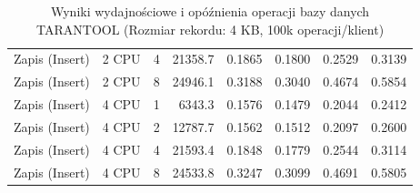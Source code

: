 \begin{table}[ht]
{\begin{tabular}{llcrrrrr}
Zapis (Insert) & 2 CPU & 4 & 21358.7 & 0.1865 & 0.1800 & 0.2529 & 0.3139 \\
Zapis (Insert) & 2 CPU & 8 & 24946.1 & 0.3188 & 0.3040 & 0.4674 & 0.5854 \\
Zapis (Insert) & 4 CPU & 1 & 6343.3 & 0.1576 & 0.1479 & 0.2044 & 0.2412 \\
Zapis (Insert) & 4 CPU & 2 & 12787.7 & 0.1562 & 0.1512 & 0.2097 & 0.2600 \\
Zapis (Insert) & 4 CPU & 4 & 21593.4 & 0.1848 & 0.1779 & 0.2544 & 0.3114 \\
Zapis (Insert) & 4 CPU & 8 & 24533.8 & 0.3247 & 0.3099 & 0.4691 & 0.5805 \\
\bottomrule
\end{tabular}%
}
\caption{Wyniki wydajnościowe i opóźnienia operacji bazy danych TARANTOOL (Rozmiar rekordu: 4 KB, 100k operacji/klient)}
\label{tab:latency_tarantool_medium_100000}
\end{table}
